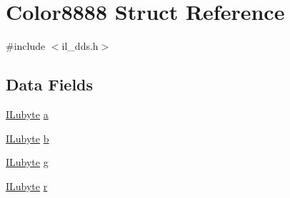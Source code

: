 \hypertarget{struct_color8888}{\section{Color8888 Struct Reference}
\label{struct_color8888}
}


{\ttfamily \#include $<$il\-\_\-dds.\-h$>$}

\subsection*{Data Fields}
\begin{DoxyCompactItemize}
\item 
\hyperlink{il_8h_a8d2f04500100a86d1b00e98ab1b15a33}{I\-Lubyte} \hyperlink{struct_color8888_a3110afaca40282cde44e6764cf21534b}{a}
\item 
\hyperlink{il_8h_a8d2f04500100a86d1b00e98ab1b15a33}{I\-Lubyte} \hyperlink{struct_color8888_a767438b01504b1c7932519cfe8b34a1b}{b}
\item 
\hyperlink{il_8h_a8d2f04500100a86d1b00e98ab1b15a33}{I\-Lubyte} \hyperlink{struct_color8888_a813a7b494594f710f6e04f086cb60fe7}{g}
\item 
\hyperlink{il_8h_a8d2f04500100a86d1b00e98ab1b15a33}{I\-Lubyte} \hyperlink{struct_color8888_afedb8d54ff10b9cac4be2824f3928524}{r}
\end{DoxyCompactItemize}


